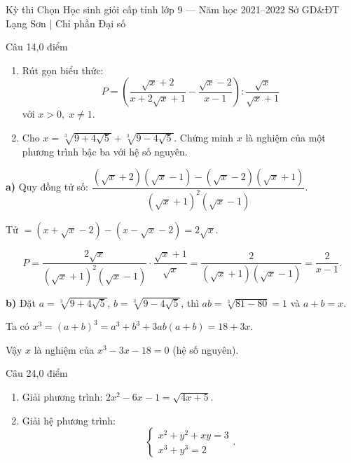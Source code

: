 ﻿%
%
  {Kỳ thi Chọn Học sinh giỏi cấp tỉnh lớp 9 — Năm học 2021--2022}%
  {Sở GD\&ĐT Lạng Sơn | Chỉ phần Đại số}

\begin{de_cau}{Câu 1}{4,0 điểm}
\begin{enumerate}[label=\alph*)]
  \item Rút gọn biểu thức:
  \[P = \left(\dfrac{\sqrt{x}+2}{x+2\sqrt{x}+1} - \dfrac{\sqrt{x}-2}{x-1}\right) : \dfrac{\sqrt{x}}{\sqrt{x}+1}\]
  với $x > 0,\; x \neq 1$.
  \item Cho $x = \sqrt[3]{9 + 4\sqrt{5}} + \sqrt[3]{9 - 4\sqrt{5}}$. Chứng minh $x$ là nghiệm của một phương trình bậc ba với hệ số nguyên.
\end{enumerate}
\end{de_cau}

\begin{loi_giai_cau}
\textbf{a)} Quy đồng tử số: $\dfrac{(\sqrt{x}+2)(\sqrt{x}-1) - (\sqrt{x}-2)(\sqrt{x}+1)}{(\sqrt{x}+1)^2(\sqrt{x}-1)}$.

Tử $= (x+\sqrt{x}-2)-(x-\sqrt{x}-2) = 2\sqrt{x}$.

\[P = \dfrac{2\sqrt{x}}{(\sqrt{x}+1)^2(\sqrt{x}-1)} \cdot \dfrac{\sqrt{x}+1}{\sqrt{x}} = \dfrac{2}{(\sqrt{x}+1)(\sqrt{x}-1)} = \boxed{\dfrac{2}{x-1}}.\]

\textbf{b)} Đặt $a = \sqrt[3]{9+4\sqrt{5}}$, $b=\sqrt[3]{9-4\sqrt{5}}$, thì $ab = \sqrt[3]{81-80}=1$ và $a+b=x$.

Ta có $x^3 = (a+b)^3 = a^3+b^3+3ab(a+b) = 18 + 3x$.

Vậy $x$ là nghiệm của $\boxed{x^3 - 3x - 18 = 0}$ (hệ số nguyên).
\end{loi_giai_cau}

\begin{de_cau}{Câu 2}{4,0 điểm}
\begin{enumerate}[label=\alph*)]
  \item Giải phương trình: $2x^2 - 6x - 1 = \sqrt{4x + 5}$.
  \item Giải hệ phương trình:
  \[\begin{cases} x^2 + y^2 + xy = 3 \\ x^3 + y^3 = 2 \end{cases}.\]
\end{enumerate}
\end{de_cau}

